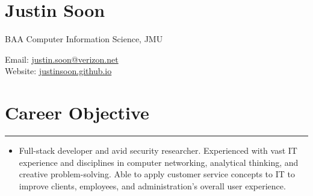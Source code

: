 \documentclass[a4paper]{article}
\author{Justin Soon}
\begin{document}
\section*{\huge\textbf Justin Soon}
\begin{minipage}{.45\linewidth}
	\begin{flushleft}
		BAA Computer Information Science, JMU\\
	\end{flushleft}
\end{minipage}
\hfill
\begin{minipage}{.45\linewidth}
	\begin{flushright}
		Email: \href{mailto:justin.soon@verizon.net}{justin.soon@verizon.net}\\
		Website: \href{http://justinsoon.github.io/}{justinsoon.github.io}\\
	\end{flushright}
\end{minipage}

\section*{Career Objective}
\hrule
\vspace{3mm}
\begin{itemize}
	\item Full-stack developer and avid security researcher. Experienced with vast IT experience and disciplines in computer networking, analytical thinking, and creative problem-solving. Able to apply customer service concepts to IT to improve clients, employees, and administration's overall user experience.\\
\end{itemize}

\end{document}
